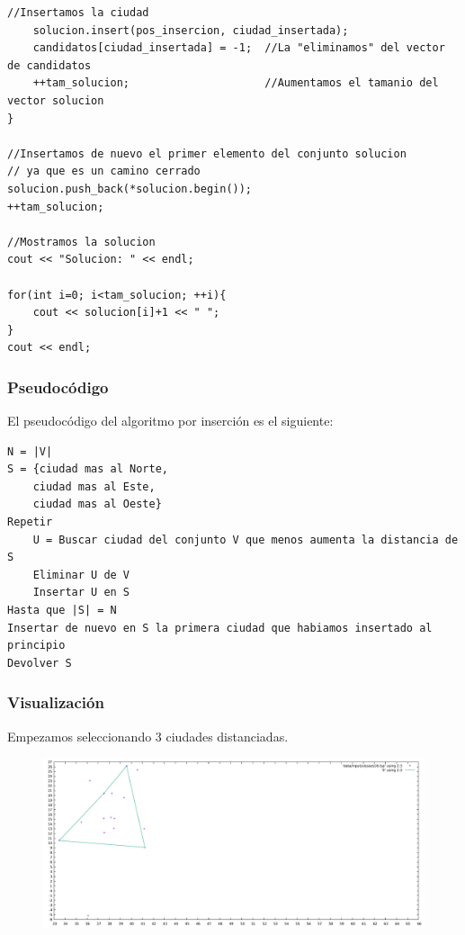 \documentclass[11pt,a4paper]{article} %
\begin{document}
\begin{lstlisting}[style=C++]
	//Insertamos la ciudad
	solucion.insert(pos_insercion, ciudad_insertada);
	candidatos[ciudad_insertada] = -1;  //La "eliminamos" del vector de candidatos
	++tam_solucion;                     //Aumentamos el tamanio del vector solucion
}    

//Insertamos de nuevo el primer elemento del conjunto solucion
// ya que es un camino cerrado
solucion.push_back(*solucion.begin());
++tam_solucion;

//Mostramos la solucion
cout << "Solucion: " << endl;

for(int i=0; i<tam_solucion; ++i){
	cout << solucion[i]+1 << " ";
}
cout << endl;
\end{lstlisting}

\subsubsection{Pseudocódigo}
El pseudocódigo del algoritmo por inserción es el siguiente:
\begin{lstlisting}
N = |V|
S = {ciudad mas al Norte, 
	ciudad mas al Este, 
	ciudad mas al Oeste}
Repetir
	U = Buscar ciudad del conjunto V que menos aumenta la distancia de S
	Eliminar U de V
	Insertar U en S
Hasta que |S| = N
Insertar de nuevo en S la primera ciudad que habiamos insertado al principio
Devolver S
\end{lstlisting}

\subsubsection{Visualización}
Empezamos seleccionando 3 ciudades distanciadas.
\begin{figure}[H]
	\centering
	\includegraphics[width=13cm]{data/graphics/insercion/insercion_1.pdf}
\end{figure}
\vspace{0,7cm}
\end{document}
